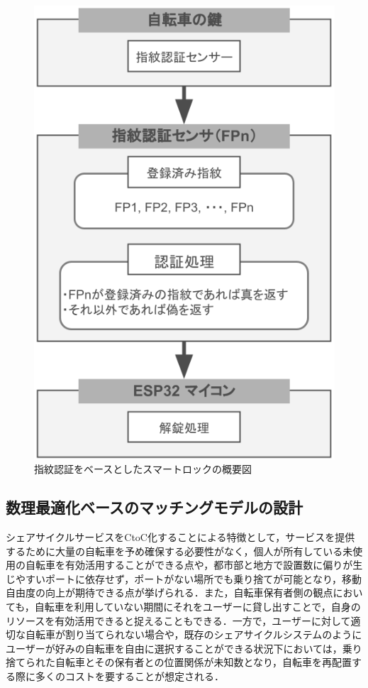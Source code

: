           
          \begin{figure}[htbp]
            \centering
            \includegraphics[scale=0.46]
            {figures/overallImageOfFingerprintUnlock.png}
            \caption{指紋認証をベースとしたスマートロックの概要図}
            \label{fig:指紋認証をベースとしたスマートロックの概要図}
          \end{figure}
          
  \subsection{数理最適化ベースのマッチングモデルの設計}
    \label{sec:数理最適化ベースのマッチングモデルの設計}
      \par シェアサイクルサービスをCtoC化することによる特徴として，サービスを提供するために大量の自転車を予め確保する必要性がなく，個人が所有している未使用の自転車を有効活用することができる点や，都市部と地方で設置数に偏りが生じやすいポートに依存せず，ポートがない場所でも乗り捨てが可能となり，移動自由度の向上が期待できる点が挙げられる．また，自転車保有者側の観点においても，自転車を利用していない期間にそれをユーザーに貸し出すことで，自身のリソースを有効活用できると捉えることもできる．一方で，ユーザーに対して適切な自転車が割り当てられない場合や，既存のシェアサイクルシステムのようにユーザーが好みの自転車を自由に選択することができる状況下においては，乗り捨てられた自転車とその保有者との位置関係が未知数となり，自転車を再配置する際に多くのコストを要することが想定される．
          
